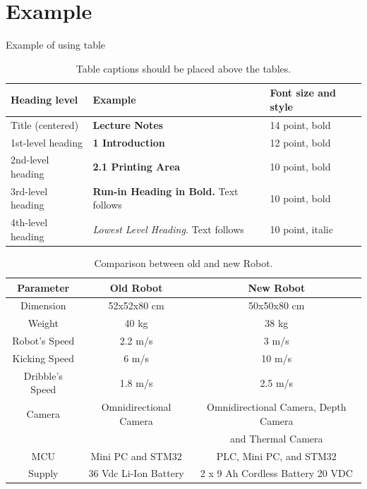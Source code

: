 \section{Example}

Example of using table 
\begin{table}[htbp]
    \caption{Table captions should be placed above the
    tables.}\label{tab1}
    \begin{tabular}{|l|l|l|}
    \hline
    Heading level &  Example & Font size and style\\
    \hline
    Title (centered) &  {\Large\bfseries Lecture Notes} & 14 point, bold\\
    1st-level heading &  {\large\bfseries 1 Introduction} & 12 point, bold\\
    2nd-level heading & {\bfseries 2.1 Printing Area} & 10 point, bold\\
    3rd-level heading & {\bfseries Run-in Heading in Bold.} Text follows & 10 point, bold\\
    4th-level heading & {\itshape Lowest Level Heading.} Text follows & 10 point, italic\\
    \hline
    \end{tabular}
\end{table} 
\FloatBarrier

\begin{table}[htbp]
    \caption{Comparison between old and new Robot.}\label{tab2}
    \centering
    \begin{tabular}{|c|c|c|}
    \hline
    \rowcolor[HTML]{C0C0C0}
    \textbf{Parameter} &  \textbf{Old Robot} & \textbf{New Robot} \\
    \hline
        Dimension & 52x52x80 cm & 50x50x80 cm \\
        \hline
        Weight & 40 kg & 38 kg \\
        \hline
        Robot's Speed & 2.2 m/s & 3 m/s \\
        \hline
        Kicking Speed & 6 m/s & 10 m/s \\
        \hline
        Dribble's Speed & 1.8 m/s & 2.5 m/s \\
        \hline
        Camera & Omnidirectional Camera & Omnidirectional Camera, Depth Camera \\ 
        & & and Thermal Camera \\
        \hline
        MCU & Mini PC and STM32 & PLC, Mini PC, and STM32 \\
        \hline
        Supply & 36 Vdc Li-Ion Battery & 2 x 9 Ah Cordless Battery 20 VDC \\
    \hline
    \end{tabular}
\end{table} 
\FloatBarrier


